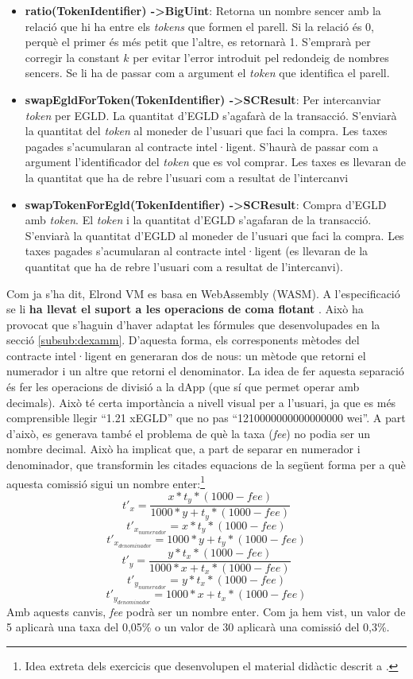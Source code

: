 \documentclass[11pt,a4paper]{article}
\begin{document}
\begin{itemize}
\item \textbf{ratio(TokenIdentifier) -\textgreater BigUint}: Retorna un nombre sencer amb la relació que hi ha entre els \textit{tokens} que formen el parell. Si la relació és 0, perquè el primer és més petit que l'altre, es retornarà 1. S'emprarà per corregir la constant \(k\) per evitar l'error introduit pel redondeig de nombres sencers. Se li ha de passar com a argument el \textit{token} que identifica el parell.
\item \textbf{swapEgldForToken(TokenIdentifier) -\textgreater SCResult}: Per intercanviar \textit{token} per EGLD. La quantitat d'EGLD s'agafarà de la transacció. S'enviarà la quantitat del \textit{token} al moneder de l'usuari que faci la compra. Les taxes pagades s'acumularan al contracte intel·ligent. S'haurà de passar com a argument l'identificador del \textit{token} que es vol comprar. Les taxes es llevaran de la quantitat que ha de rebre l'usuari com a resultat de l'intercanvi
\item \textbf{swapTokenForEgld(TokenIdentifier) -\textgreater SCResult}: Compra d'EGLD amb \textit{token}. El \textit{token} i la quantitat d'EGLD s'agafaran de la transacció. S'enviarà la quantitat d'EGLD al moneder de l'usuari que faci la compra. Les taxes pagades s'acumularan al contracte intel·ligent (es llevaran de la quantitat que ha de rebre l'usuari com a resultat de l'intercanvi).
\end{itemize}
 
Com ja s'ha dit, Elrond VM es basa en WebAssembly (WASM). A l'especificació se li \textbf{ha llevat el suport a les operacions de coma flotant} \cite{mincub2020}. Això ha provocat que s'haguin d'haver adaptat les fórmules que desenvolupades en la secció \ref{subsub:dexamm}. D'aquesta forma, els corresponents mètodes del contracte intel·ligent en generaran dos de nous: un mètode que retorni el numerador i un altre que retorni el denominator. La idea de fer aquesta separació és fer les operacions de divisió a la dApp (que sí que permet operar amb decimals). Això té certa importància a nivell visual per a l'usuari, ja que es més comprensible llegir ``1.21 xEGLD'' que no pas ``1210000000000000000 wei''. A part d'això, es generava també el problema de què la taxa (\textit{fee}) no podia ser un nombre decimal. Això ha implicat que, a part de separar en numerador i denominador, que transformin les citades equacions de la següent forma per a què aquesta comissió sigui un nombre enter:\footnote{Idea extreta dels exercicis que desenvolupen el material didàctic descrit a \cite{delarosa}.}
\[t'_x = \frac{x * t_y *(1000 - fee)}{1000 * y + t_y * (1000 - fee)}\]
\[t'_{x_{numerador}} = x * t_y *(1000 - fee)\]
\[t'_{x_{denominador}} = 1000 * y + t_y * (1000 - fee)\]
\[t'_y = \frac{y * t_x * (1000 - fee)}{1000 * x + t_x * (1000 - fee)} \]
\[t'_{y_{numerador}} = y * t_x * (1000 - fee)\]
\[t'_{y_{denominador}} = 1000 * x + t_x * (1000 - fee)\]
Amb aquests canvis, \textit{fee} podrà ser un nombre enter. Com ja hem vist, un valor de 5 aplicarà una taxa del 0,05\% o un valor de 30 aplicarà una comissió  del 0,3\%.
\end{document}

